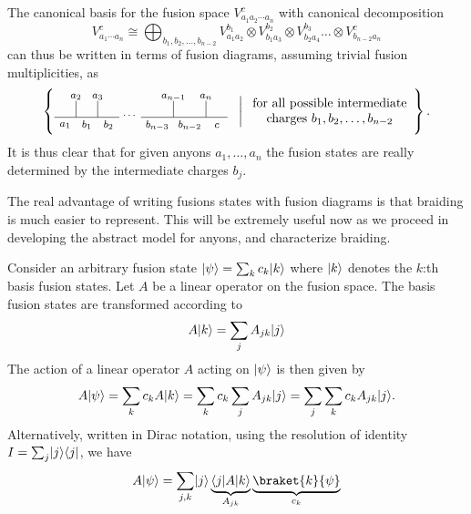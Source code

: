 The canonical basis for the fusion space $V_{a_1a_2\cdots a_n}^c$ with canonical decomposition
\begin{equation}
  V_{a_1 \cdots a_n}^c \cong \bigoplus_{b_1,b_2,\ldots,b_{n-2}} V_{a_1a_2}^{b_1} \otimes V_{b_1 a_3}^{b_2} \otimes V_{b_2 a_4}^{b_3} \ldots \otimes V_{b_{n-2} a_n}^c
\end{equation}
can thus be written in terms of fusion diagrams, assuming trivial fusion multiplicities, as
\begin{equation}
  \left\{
  \begin{tikzpicture}[scale=0.3,font=\footnotesize,anchor=mid,baseline={([yshift=-.5ex]current bounding box.center)}]
    \node at (0, -0.6) {$a_1$};
    \node at (1, 2) {$a_2$};
    \node at (3, 2) {$a_3$};
    \node at (10, 2) {$a_{n-1}$};
    \node at (13, 2) {$a_n$};
%
    \draw (1, 0) to (1, 1.5);
    \draw (3, 0) to (3, 1.5);
%
    \draw (10, 0) to (10, 1.5);
    \draw (13, 0) to (13, 1.5);
%
    \draw (-1, 0) to (5, 0);
    \draw (7, 0) to (15, 0);
%
    \node at (2, -0.7) {$b_1$};
    \node at (4, -0.7) {$b_2$};
    \node at (6, 0.2) {$\cdots$};
%
    \node at (8.5, -0.7) {$b_{n-3}$};
    \node at (11.5, -0.7) {$b_{n-2}$};
    \node at (14, -0.7) {$c$};
  \end{tikzpicture}
  \;\;\;\bigg|\; \begin{array}{c}\text{for all possible intermediate} \\ \text{charges $b_1, b_2, \ldots, b_{n-2}$}\end{array}
  \right\}.
\end{equation}
It is thus clear that for given anyons $a_1, \ldots, a_n$ the fusion states are really determined by the intermediate charges $b_j$.

The real advantage of writing fusions states with fusion diagrams is that braiding is much easier to represent. This will be extremely useful now as we proceed in developing the abstract model for anyons, and characterize braiding.

Consider an arbitrary fusion state $\lvert\psi\rangle = \sum_k c_k \lvert k\rangle$ where $\lvert k\rangle$ denotes the $k$:th basis fusion states. Let $A$ be a linear operator on the fusion space. The basis fusion states are transformed according to
\begin{equation}\label{eq:linear op on basis state}
  A\lvert k\rangle = \sum_j A_{jk} \lvert j\rangle
\end{equation}
The action of a linear operator $A$ acting on $\lvert\psi\rangle$ is then given by
\begin{equation}
  A \lvert\psi\rangle = \sum_k c_k A \lvert k\rangle = \sum_{k} c_k \sum_j A_{jk} \lvert j\rangle = \sum_j \sum_k c_k A_{jk} \lvert j\rangle.
\end{equation}
Alternatively, written in Dirac notation, using the resolution of identity $I = \sum_j \lvert j\rangle\langle j\rvert$, we have
\begin{equation}
  A \ket{\psi} = \sum_{j,k} \ket{j} \underbrace{\bra{j} A \ket{k}}_{A_{jk}} \underbrace{\braket{k}{\psi}}_{c_k}
\end{equation}

